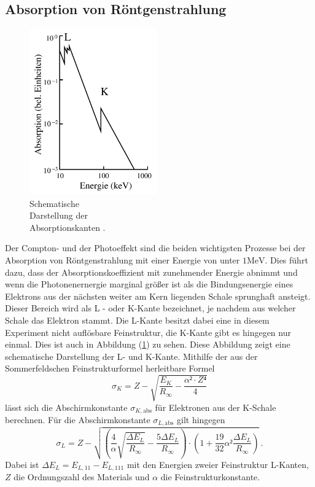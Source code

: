 \subsection{Absorption von Röntgenstrahlung}
\begin{figure}
    \begin{center}
        \includegraphics[width=5.5cm]{content/Bilder/Kantenbild.jpeg}
        \caption[width=5.5cm]{Schematische \\ Darstellung der \\Absorptionskanten \cite{anleitungV602}.}
        \label{fig:Kantenbild}
    \end{center}
\end{figure}
Der Compton- und der Photoeffekt sind die beiden wichtigsten Prozesse bei der Absorption von Röntgenstrahlung mit einer Energie von unter $1 \si{\mega\electronvolt}$.
Dies führt dazu, dass der Absorptionskoeffizient mit zunehmender Energie abnimmt und wenn die Photonenernergie marginal größer ist als die Bindungsenergie eines 
Elektrons aus der nächsten weiter am Kern liegenden Schale sprunghaft ansteigt. Dieser Bereich wird als L - oder K-Kante bezeichnet, je nachdem aus welcher Schale das 
Elektron stammt. Die L-Kante besitzt dabei eine in diesem Experiment nicht auflösbare Feinstruktur, die K-Kante gibt es hingegen nur einmal. Dies ist auch in 
Abbildung (\ref{fig:Kantenbild}) zu sehen. Diese Abbildung zeigt eine schematische Darstellung der L- und K-Kante. 
Mithilfe der aus der Sommerfeldschen Feinstrukturformel herleitbare Formel 
\begin{equation}
    \sigma_K = Z - \sqrt{\frac{E_K}{R_{\infty}} - \frac{\alpha² \cdot Z⁴}{4}}
    \label{eqn:sigma_k}
\end{equation}
lässt sich die Abschirmkonstante $\sigma_{K,\text{abs}}$ für Elektronen aus der K-Schale berechnen. 
Für die Abschirmkonstante $\sigma_{L,\text{abs}}$ gilt hingegen 
\begin{equation}
    \sigma_L = Z - \sqrt{\left(\frac{4}{\alpha}\sqrt{\frac{\Delta E_L}{R_{\infty}}} - \frac{5 \Delta E_L}{R_{\infty}}\right) \cdot \left(1 + \frac{19}{32}\alpha² \frac{\Delta E_L}{R_{\infty}}\right)} \, .
    \label{eqn:sigma_l}
\end{equation}
Dabei ist $\Delta E_L = E_{L,11} - E_{L,111}$ mit den Energien zweier Feinstruktur L-Kanten, $Z$ die Ordnungszahl des Materials und $\alpha$ die Feinstrukturkonstante.
\FloatBarrier 
